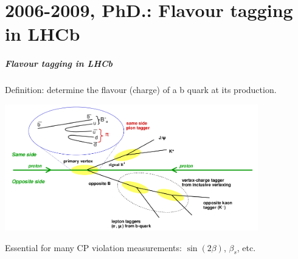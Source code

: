 \documentclass{beamer}
\begin{document}
{

\part{2006-2009, PhD.: Flavour tagging in LHCb} 
\begin{frame}
\partpage
\end{frame}
\begin{frame}
\frametitle{Flavour tagging in LHCb}
Definition: determine the flavour (charge) of a b quark at its production.
\begin{center}
\includegraphics[width=11cm]{tagging.png}
\end{center}
Essential for many \alert{CP violation measurements}: $\sin(2\beta)$, $\beta_s$,
etc.
\end{frame}
}
\end{document}
